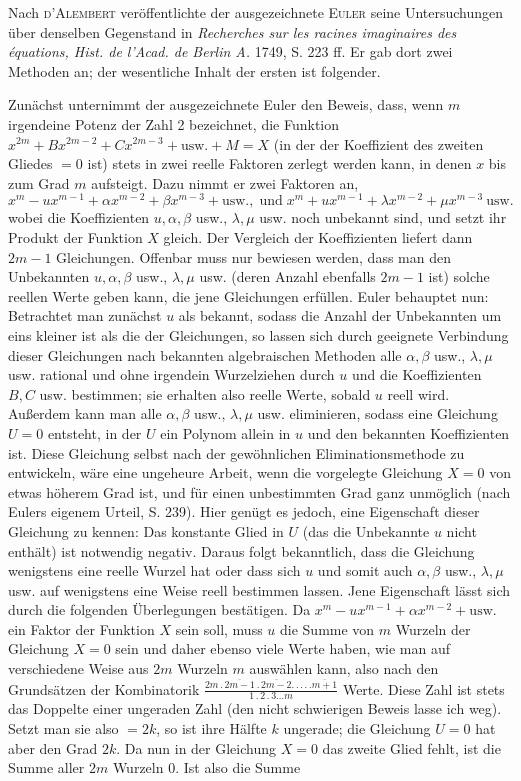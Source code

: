 Nach \textsc{d'Alembert} veröffentlichte der ausgezeichnete \textsc{Euler} seine Untersuchungen über denselben Gegenstand in \textit{Recherches sur les racines imaginaires des équations, Hist. de l'Acad. de Berlin A.} 1749, S. 223 ff. Er gab dort zwei Methoden an; der wesentliche Inhalt der ersten ist folgender.

Zunächst unternimmt der ausgezeichnete Euler den Beweis, dass, wenn $m$ irgendeine Potenz der Zahl 2 bezeichnet, die Funktion $x^{2m}+Bx^{2m-2}+Cx^{2m-3}+\text{usw.}+M=X$ (in der der Koeffizient des zweiten Gliedes $=0$ ist) stets in zwei reelle Faktoren zerlegt werden kann, in denen $x$ bis zum Grad $m$ aufsteigt. Dazu nimmt er zwei Faktoren an,
\[
x^m-ux^{m-1}+\alpha x^{m-2}+\beta x^{m-3}+\text{usw.},\;\text{und}\; x^m+ux^{m-1}+\lambda x^{m-2}+\mu x^{m-3}\ \text{usw.}
\]
wobei die Koeffizienten $u,\alpha,\beta$ usw., $\lambda,\mu$ usw. noch unbekannt sind, und setzt ihr Produkt der Funktion $X$ gleich. Der Vergleich der Koeffizienten liefert dann $2m-1$ Gleichungen. Offenbar muss nur bewiesen werden, dass man den Unbekannten $u,\alpha,\beta$ usw., $\lambda,\mu$ usw. (deren Anzahl ebenfalls $2m-1$ ist) solche reellen Werte geben kann, die jene Gleichungen erfüllen. Euler behauptet nun: Betrachtet man zunächst $u$ als bekannt, sodass die Anzahl der Unbekannten um eins kleiner ist als die der Gleichungen, so lassen sich durch geeignete Verbindung dieser Gleichungen nach bekannten algebraischen Methoden alle $\alpha,\beta$ usw., $\lambda,\mu$ usw. rational und ohne irgendein Wurzelziehen durch $u$ und die Koeffizienten $B,C$ usw. bestimmen; sie erhalten also reelle Werte, sobald $u$ reell wird. Außerdem kann man alle $\alpha,\beta$ usw., $\lambda,\mu$ usw. eliminieren, sodass eine Gleichung $U=0$ entsteht, in der $U$ ein Polynom allein in $u$ und den bekannten Koeffizienten ist. Diese Gleichung selbst nach der gewöhnlichen Eliminationsmethode zu entwickeln, wäre eine ungeheure Arbeit, wenn die vorgelegte Gleichung $X=0$ von etwas höherem Grad ist, und für einen unbestimmten Grad ganz unmöglich (nach Eulers eigenem Urteil, S. 239). Hier genügt es jedoch, eine Eigenschaft dieser Gleichung zu kennen: Das konstante Glied in $U$ (das die Unbekannte $u$ nicht enthält) ist notwendig negativ. Daraus folgt bekanntlich, dass die Gleichung wenigstens eine reelle Wurzel hat oder dass sich $u$ und somit auch $\alpha,\beta$ usw., $\lambda,\mu$ usw. auf wenigstens eine Weise reell bestimmen lassen. Jene Eigenschaft lässt sich durch die folgenden Überlegungen bestätigen. Da $x^m-ux^{m-1}+\alpha x^{m-2}+\text{usw.}$ ein Faktor der Funktion $X$ sein soll, muss $u$ die Summe von $m$ Wurzeln der Gleichung $X=0$ sein und daher ebenso viele Werte haben, wie man auf verschiedene Weise aus $2m$ Wurzeln $m$ auswählen kann, also nach den Grundsätzen der Kombinatorik $\frac{2m\mathbin{.}\overline{2m-1}\mathbin{.}\overline{2m-2}.\,.\,.\,.\,.\overline{m+1}}{1\mathbin{.}2\mathbin{.}3\ldots m}$ Werte. Diese Zahl ist stets das Doppelte einer ungeraden Zahl (den nicht schwierigen Beweis lasse ich weg). Setzt man sie also $=2k$, so ist ihre Hälfte $k$ ungerade; die Gleichung $U=0$ hat aber den Grad $2k$. Da nun in der Gleichung $X=0$ das zweite Glied fehlt, ist die Summe aller $2m$ Wurzeln 0. Ist also die Summe 